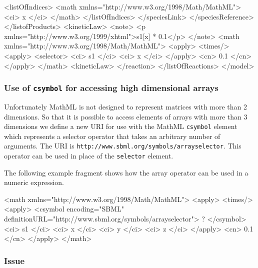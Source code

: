\documentclass{cekarticle}
\begin{document}
\begin{example}
                        <listOfIndices>
                            <math xmlns="http://www.w3.org/1998/Math/MathML">
                                <ci> x </ci>
                            </math>
                        </listOfIndices>
                    </speciesLink>
                </speciesReference>
             </listofProducts>
            <kineticLaw>
                <note>
                    <p xmlns="http://www.w3.org/1999/xhtml">s1[x] * 0.1</p>
                </note>
                <math xmlns="http://www.w3.org/1998/Math/MathML">
                    <apply>
                        <times/>
                        <apply>
                            <selector>
                            <ci> s1 </ci>
                            <ci> x </ci>
                        </apply>
                        <cn> 0.1 </cn>
                    </apply>
                </math>
            <kineticLaw>
        </reaction>
    </listOfReactions>
</model>
\end{example}

\subsubsection{Use of \texttt{csymbol} for accessing high dimensional arrays}

Unfortunately MathML is not designed to represent matrices with more than 2 dimensions.
So that it is possible to access elements of arrays with more than 3 dimensions we
define a new URI for use with the MathML \texttt{csymbol} element which represents a selector
operator that takes an arbitrary number of arguments.  The URI is
\texttt{http://www.sbml.org/symbols/arrayselector}. This operator can be used in place 
of the \texttt{selector} element.

The following example fragment shows how the array operator can be used in
a numeric expression.  

\begin{example}
<math xmlns="http://www.w3.org/1998/Math/MathML">
    <apply>
        <times/>
        <apply>
            <csymbol
                encoding="SBML" 
                definitionURL="http://www.sbml.org/symbols/arrayselector">
                ?
            </csymbol>
            <ci> s1 </ci>
            <ci> x </ci>
            <ci> y </ci>
            <ci> z </ci>
        </apply>
        <cn> 0.1 </cn>
    </apply>
</math>
\end{example}

\subsubsection{Issue}
\end{document}
